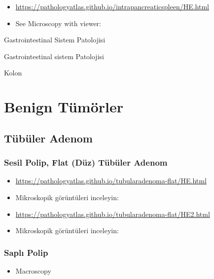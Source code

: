 \documentclass[
  letterpaper,
  DIV=11,
  numbers=noendperiod]{scrreprt}
\providecommand{\tightlist}{%
  \setlength{\itemsep}{0pt}\setlength{\parskip}{0pt}}
\begin{document}
\begin{itemize}
\item
  \url{https://pathologyatlas.github.io/intrapancreaticspleen/HE.html}
\item
  See Microscopy with viewer:
\end{itemize}

Gastrointestinal Sistem Patolojisi

Gastrointestinal sistem Patolojisi

Kolon

\hypertarget{benign-tuxfcmuxf6rler-1}{%
\chapter{Benign Tümörler}\label{benign-tuxfcmuxf6rler-1}}

\hypertarget{tuxfcbuxfcler-adenom-1}{%
\section{Tübüler Adenom}\label{tuxfcbuxfcler-adenom-1}}

\hypertarget{sesil-polip-flat-duxfcz-tuxfcbuxfcler-adenom-1}{%
\subsection{Sesil Polip, Flat (Düz) Tübüler
Adenom}\label{sesil-polip-flat-duxfcz-tuxfcbuxfcler-adenom-1}}

\begin{itemize}
\item
  \url{https://pathologyatlas.github.io/tubularadenoma-flat/HE.html}
\item
  Mikroskopik görüntüleri inceleyin:
\end{itemize}

\begin{itemize}
\item
  \url{https://pathologyatlas.github.io/tubularadenoma-flat/HE2.html}
\item
  Mikroskopik görüntüleri inceleyin:
\end{itemize}

\hypertarget{saplux131-polip-1}{%
\subsection{Saplı Polip}\label{saplux131-polip-1}}

\begin{itemize}
\tightlist
\item
  Macroscopy
\end{itemize}
\end{document}
